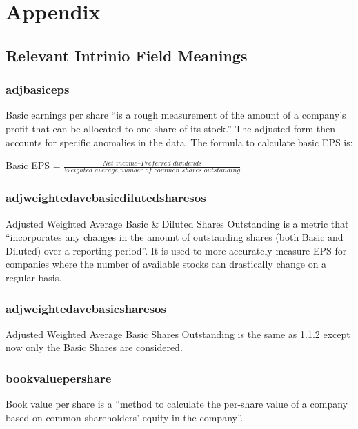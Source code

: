 \section{Appendix}
\subsection{Relevant Intrinio Field Meanings} \label{intrinioFields}
\subsubsection{adjbasiceps}
Basic earnings per share ``is a rough measurement of the amount of a company's profit that can be allocated to one share of its stock.''\cite{basicEarnings} The adjusted form then accounts for specific anomalies in the data. The formula to calculate basic EPS is: \newline 

Basic EPS = $ \frac{Net \, \, income – Preferred \, \, dividends}{Weighted \, \, average \, \, number \, \, of \, \, common \, \, shares \, \, outstanding}$

\subsubsection{adjweightedavebasicdilutedsharesos} \label{adjweightedavebasicdilutedsharesos}
Adjusted Weighted Average Basic \& Diluted Shares Outstanding is a metric that ``incorporates any changes in the amount of outstanding shares (both Basic and Diluted) over a reporting period''. It is used to more accurately measure EPS for companies where the number of available stocks can drastically change on a regular basis. \cite{weightedOutstandingShares}

\subsubsection{adjweightedavebasicsharesos}
Adjusted Weighted Average Basic Shares Outstanding is the same as \ref{adjweightedavebasicdilutedsharesos} except now only the Basic Shares are considered.

\subsubsection{bookvaluepershare}
Book value per share is a ``method to calculate the per-share value of a company based on common shareholders' equity in the company''. \newline

